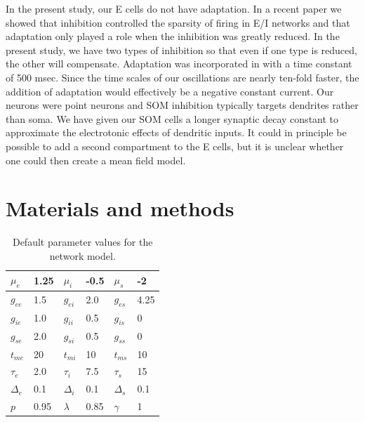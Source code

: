 \documentclass[10pt,letterpaper]{article}
\begin{document}
In the present study, our E cells do not have adaptation. In a recent paper \cite{grishma} we showed that inhibition controlled the sparsity of firing in E/I networks and that adaptation only played a role when the inhibition was greatly reduced. In the present study, we have two types of inhibition so that even if one type is reduced, the other will compensate.   Adaptation was incorporated in \cite{FMM} with a time constant of 500 msec. Since the time scales of our oscillations are nearly ten-fold faster, the addition of adaptation would effectively be a negative constant current.  Our neurons were point neurons and SOM inhibition typically targets dendrites rather than soma. We have given our SOM cells a longer synaptic decay constant to approximate the electrotonic effects of dendritic inputs. It could in principle be possible to add a second compartment to the E cells, but it is unclear whether one could then create a mean field model.



\section*{Materials and methods}


 \begin{table}[h!]
    \centering
    \begin{tabular}{|l|l||l|l||l|l|}
        \hline
        $\mu_e$ & 1.25 & $\mu_i$ & -0.5 & $\mu_s$ & -2 \\
        \hline
        $g_{ee}$ & 1.5 & $g_{ei}$ & 2.0 & $g_{es}$ & 4.25 \\
        $g_{ie}$ & 1.0 & $g_{ii}$ & 0.5 & $g_{is}$ & 0 \\
        $g_{se}$ & 2.0 & $g_{si}$ & 0.5 & $g_{ss}$ & 0 \\
        \hline
        $t_{me}$ & 20 & $t_{mi}$ & 10 & $t_{ms}$ & 10 \\
        $\tau_{e}$ & 2.0 & $\tau_{i}$ & 7.5 & $\tau_{s}$ & 15 \\
        \hline
        $\Delta_{e}$ & 0.1 & $\Delta_{i}$ & 0.1 & $\Delta_{s}$ & 0.1 \\
        \hline
        $p$ & 0.95 & $\lambda$ & 0.85 &  $\gamma$ & 1  \\
        \hline
    \end{tabular}
    \caption{Default parameter values for the network model.}
    \label{tab:par}
\end{table}
\end{document}
